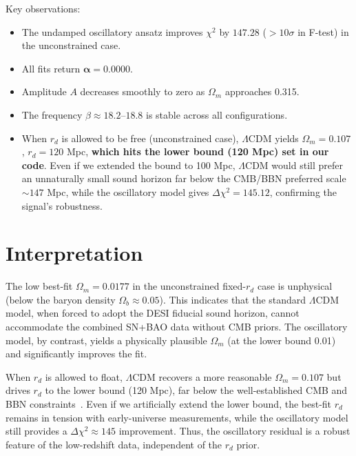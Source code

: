 \documentclass[10pt,a4paper,twocolumn]{article}
\begin{document}
Key observations:
\begin{itemize}
    \item The undamped oscillatory ansatz improves $\chi^2$ by $\mathbf{147.28}$ ($>10\sigma$ in F-test) in the unconstrained case.
    \item All fits return $\mathbf{\alpha=0.0000}$.
    \item Amplitude $A$ decreases smoothly to zero as $\Omega_m$ approaches 0.315.
    \item The frequency $\beta\approx18.2$--$18.8$ is stable across all configurations.
    \item When $r_d$ is allowed to be free (unconstrained case), $\Lambda$CDM yields $\Omega_m=0.107$, $r_d=120$ Mpc,
          \textbf{which hits the lower bound (120 Mpc) set in our code}. Even if we extended the bound to 100 Mpc,
          $\Lambda$CDM would still prefer an unnaturally small sound horizon far below the CMB/BBN preferred scale $\sim147$ Mpc,
          while the oscillatory model gives $\Delta\chi^2=145.12$, confirming the signal's robustness.
\end{itemize}

\section{Interpretation}
The low best-fit $\Omega_m=0.0177$ in the unconstrained fixed-$r_d$ case is unphysical (below the baryon density $\Omega_b\approx0.05$).
This indicates that the standard $\Lambda$CDM model, when forced to adopt the DESI fiducial sound horizon,
cannot accommodate the combined SN+BAO data without CMB priors.
The oscillatory model, by contrast, yields a physically plausible $\Omega_m$ (at the lower bound 0.01) and significantly improves the fit.

When $r_d$ is allowed to float, $\Lambda$CDM recovers a more reasonable $\Omega_m=0.107$ but drives $r_d$ to
the lower bound (120 Mpc), far below the well-established CMB and BBN constraints~\cite{Planck2018}.
Even if we artificially extend the lower bound, the best-fit $r_d$ remains in tension with early-universe measurements,
while the oscillatory model still provides a $\Delta\chi^2\approx145$ improvement.
Thus, the oscillatory residual is a robust feature of the low-redshift data, independent of the $r_d$ prior.
\end{document}
